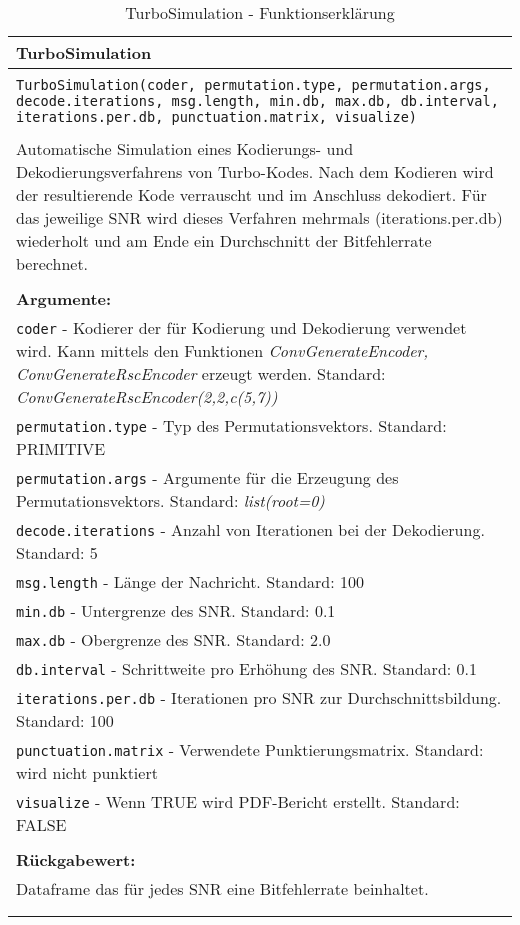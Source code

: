 \begin{longtable}{|p{\textwidth}|}
\hline
\rowcolor{lightblue}TurboSimulation\\
\hline
\\
\texttt{TurboSimulation(coder, permutation.type, permutation.args, decode.iterations, msg.length, min.db, max.db, db.interval, iterations.per.db, punctuation.matrix, visualize)}\\
\\
Automatische Simulation eines Kodierungs- und Dekodierungsverfahrens von Turbo-Kodes. Nach dem Kodieren wird der resultierende Kode verrauscht und im Anschluss dekodiert. Für das jeweilige SNR wird dieses Verfahren mehrmals (iterations.per.db) wiederholt und am Ende ein Durchschnitt der Bitfehlerrate berechnet.\\
\\
\textbf{Argumente:}\\
\texttt{coder} - Kodierer der für Kodierung und Dekodierung verwendet wird. Kann mittels den Funktionen \emph{ConvGenerateEncoder, ConvGenerateRscEncoder} erzeugt werden. Standard: \emph{ConvGenerateRscEncoder(2,2,c(5,7))}\\
\texttt{permutation.type} - Typ des Permutationsvektors. Standard: PRIMITIVE\\
\texttt{permutation.args} - Argumente für die Erzeugung des Permutationsvektors. Standard: \emph{list(root=0)}\\
\texttt{decode.iterations} - Anzahl von Iterationen bei der Dekodierung. Standard: 5\\
\texttt{msg.length} - Länge der Nachricht. Standard: 100\\
\texttt{min.db} - Untergrenze des SNR. Standard: 0.1\\
\texttt{max.db} - Obergrenze des SNR. Standard: 2.0\\
\texttt{db.interval} - Schrittweite pro Erhöhung des SNR. Standard: 0.1\\
\texttt{iterations.per.db} - Iterationen pro SNR zur Durchschnittsbildung. Standard: 100\\
\texttt{punctuation.matrix} - Verwendete Punktierungsmatrix. Standard: wird nicht punktiert\\
\texttt{visualize} - Wenn TRUE wird PDF-Bericht erstellt. Standard: FALSE\\
\\
\textbf{Rückgabewert:}\\
Dataframe das für jedes SNR eine Bitfehlerrate beinhaltet.\\
\\
\hline
\caption{TurboSimulation - Funktionserklärung}
\end{longtable}